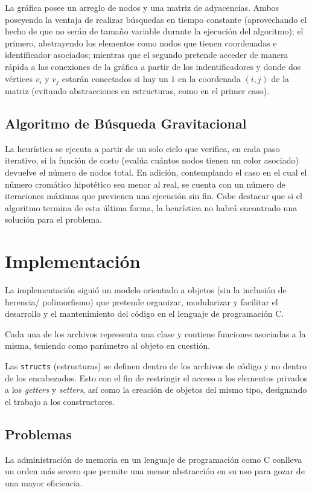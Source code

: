 \documentclass[a4paper]{report}
\begin{document}
La gr\'afica posee un arreglo de nodos y una matriz de adyacencias. Ambos poseyendo la ventaja de
realizar b\'usquedas en tiempo constante (aprovechando el hecho de que no ser\'an de tama\~no
variable durante la ejecuci\'on del algoritmo); el primero, abstrayendo los elementos como nodos
que tienen coordenadas e identificador asociados; mientras que el segundo pretende acceder de
manera r\'apida a las conexiones de la gr\'afica a partir de los indentificadores y donde dos
v\'ertices $v_i$ y $v_j$ estar\'an conectados si hay un $1$ en la coordenada $(i, j)$ de la matriz
(evitando abstracciones en estructuras, como en el primer caso).

\section{Algoritmo de B\'usqueda Gravitacional}

La heur\'istica se ejecuta a partir de un solo ciclo que verifica, en cada paso iterativo,
si la funci\'on de costo (eval\'ua cu\'antos nodos tienen un color asociado) devuelve
el n\'umero de nodos total. En adici\'on, contemplando el caso en el cual el n\'umero
crom\'atico hipot\'etico sea menor al real, se cuenta con un n\'umero de iteraciones
m\'aximas que previenen una ejecuci\'on sin fin. Cabe destacar que si el algoritmo termina
de esta \'ultima forma, la heur\'istica no habr\'a encontrado una soluci\'on para el
problema.

\chapter{Implementaci\'on}
La implementaci\'on sigui\'o un modelo orientado a objetos (sin la inclusi\'on de herencia/
polimorfismo) que pretende organizar, modularizar y facilitar el desarrollo y el mantenimiento
del c\'odigo en el lenguaje de programaci\'on C.

Cada una de los archivos representa una clase y contiene funciones asociadas a la misma,
teniendo como par\'ametro al objeto en cuesti\'on.

Las \texttt{structs} (estructuras) se definen dentro de los archivos de c\'odigo y no dentro
de los encabezados. Esto con el fin de restringir el acceso a los elementos privados a los
\textit{getters} y \textit{setters}, as\'i como la creaci\'on de objetos del mismo tipo,
designando el trabajo a los constructores.

\section{Problemas}
La administraci\'on de memoria en un lenguaje de programaci\'on como C conlleva un orden m\'as
severo que permite una menor abstracci\'on en su uso para gozar de una mayor eficiencia.
\end{document}
